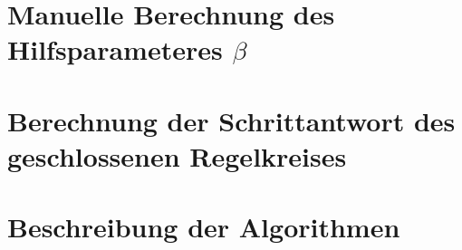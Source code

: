 \clearpage
\section{Manuelle Berechnung des Hilfsparameteres $\beta$}
\label{app:beta}


\clearpage
\section{Berechnung der Schrittantwort des geschlossenen Regelkreises}
\label{app:fft}


\clearpage
\section{Beschreibung der Algorithmen}
\label{app:algos}

